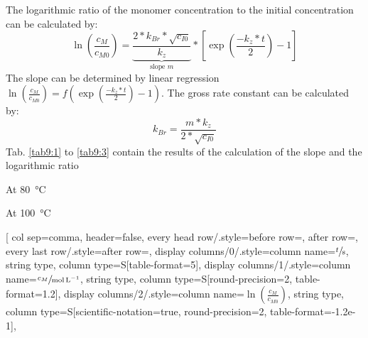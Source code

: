 \begin{solution}
The logarithmic ratio of the monomer concentration to the initial concentration can be calculated by:
%
\begin{equation}\label{eqn9:logratio}
\ln \left( \frac{c_M}{c_{M0}} \right) = \underbrace{\frac{2 * k_{Br} * \sqrt{c_{I0}}}{k_z}}_{\text{slope } m}  * \left[ \exp\left(\frac{-k_z * t}{2} \right) - 1 \right]
\end{equation}
The slope can be determined by linear regression $\ln \left( \frac{c_M}{c_{M0}} \right) = f\left(\exp\left(\frac{-k_z * t}{2} \right) - 1\right)$. The gross rate constant can be calculated by:
\begin{equation}\label{eqn9:kbr}
 k_{Br} = \frac{m * k_z}{2 * \sqrt{c_{I0}}}
\end{equation}
Tab. \ref{tab9:1} to \ref{tab9:3} contain the results of the calculation of the slope and the logarithmic ratio
\begin{table}[H]
\caption{At \SI{80}{\celsius}}
\label{tab9:1}
\centering
{}
\end{table}
\begin{table}[H]
\centering
\caption{At \SI{100}{\celsius}}
\label{tab9:2}
\pgfplotstabletypeset[%
col sep=comma, header=false,
every head row/.style={before row={\toprule}, after row={\midrule}},
every last row/.style={after row=\bottomrule},
display columns/0/.style={column name={$\sfrac{t}{\si{\second}}$}, string type, column type={S[table-format=5]}},
display columns/1/.style={column name={$\sfrac{c_M}{\si{\mole\per\liter}}$}, string type, column type={S[round-precision=2, table-format=1.2]}},
display columns/2/.style={column name={${\ln\left(\frac{c_M}{c_{M0}}\right)}$}, string type, column type={S[scientific-notation=true, round-precision=2, table-format=-1.2e-1]}},

\end{table}
\end{solution}
